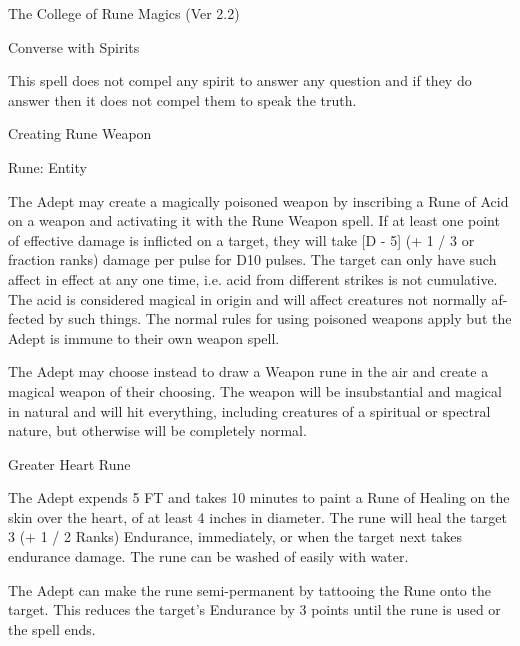 \begin{Chapter}{The College of Rune Magics (Ver 2.2)}
\begin{spell}[S-3]{Converse with Spirits}
\begin{effects}
This spell does not compel any spirit to answer any question and if
they do answer then it does not compel them to speak the truth.
\end{effects}
\end{spell}

\begin{spell}[S-4]{Creating Rune Weapon}

Rune: Entity 
\begin{effects}
The Adept may create a magically poisoned weapon by inscribing a Rune
of Acid on a weapon and activating it with the Rune Weapon spell.  If
at least one point of effective damage is inflicted on a target, they
will take [D - 5] (+ 1 / 3 or fraction ranks) damage per pulse for D10
pulses.  The target can only have such affect in effect at any one
time, i.e. acid from different strikes is not cumulative.  The acid is
considered magical in origin and will affect creatures not normally
af- fected by such things.  The normal rules for using poisoned
weapons apply but the Adept is immune to their own weapon spell.

The Adept may choose instead to draw a Weapon rune in the air and
create a magical weapon of their choosing.  The weapon will be
insubstantial and magical in natural and will hit everything,
including creatures of a spiritual or spectral nature, but otherwise
will be completely normal.
\end{effects}
\end{spell}

\begin{spell}[S-5]{Greater Heart Rune}

\begin{effects}
The Adept expends 5 FT and takes 10 minutes to paint a Rune of Healing
on the skin over the heart, of at least 4 inches in diameter.  The
rune will heal the target 3 (+ 1 / 2 Ranks) Endurance, immediately, or
when the target next takes endurance damage.  The rune can be washed
of easily with water.

The Adept can make the rune semi-permanent by tattooing the Rune onto
the target. This reduces the target’s Endurance by 3 points until the
rune is used or the spell ends.
\end{effects}
\end{spell}


\end{Chapter}
